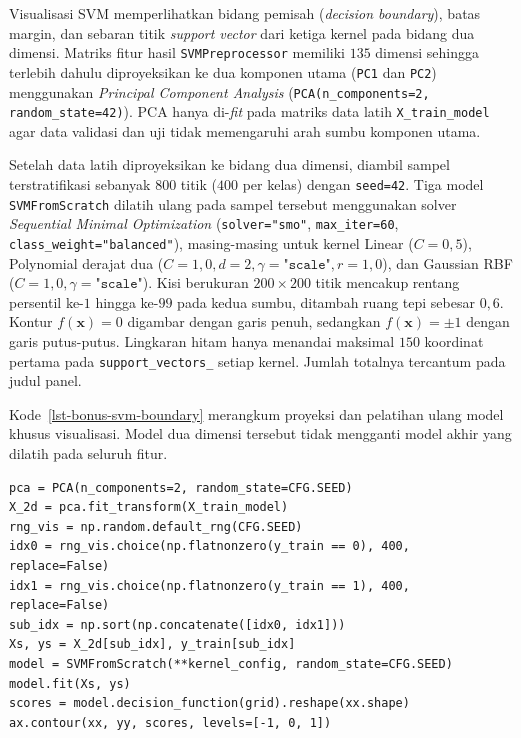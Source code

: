 Visualisasi SVM memperlihatkan bidang pemisah (\textit{decision boundary}), batas margin, dan sebaran titik \textit{support vector} dari ketiga kernel pada bidang dua dimensi. Matriks fitur hasil \texttt{SVMPreprocessor} memiliki $135$ dimensi sehingga terlebih dahulu diproyeksikan ke dua komponen utama (\texttt{PC1} dan \texttt{PC2}) menggunakan \textit{Principal Component Analysis} (\texttt{PCA(n\_components=2, random\_state=42)}). PCA hanya di-\textit{fit} pada matriks data latih \texttt{X\_train\_model} agar data validasi dan uji tidak memengaruhi arah sumbu komponen utama.

Setelah data latih diproyeksikan ke bidang dua dimensi, diambil sampel terstratifikasi sebanyak $800$ titik ($400$ per kelas) dengan \texttt{seed=42}. Tiga model \texttt{SVMFromScratch} dilatih ulang pada sampel tersebut menggunakan solver \textit{Sequential Minimal Optimization} (\texttt{solver="smo"}, \texttt{max\_iter=60}, \texttt{class\_weight="balanced"}), masing-masing untuk kernel Linear ($C=0{,}5$), Polynomial derajat dua ($C=1{,}0, d=2, \gamma=\texttt{"scale"}, r=1{,}0$), dan Gaussian RBF ($C=1{,}0, \gamma=\texttt{"scale"}$). Kisi berukuran $200 \times 200$ titik mencakup rentang persentil ke-$1$ hingga ke-$99$ pada kedua sumbu, ditambah ruang tepi sebesar $0{,}6$. Kontur $f(\mathbf{x}) = 0$ digambar dengan garis penuh, sedangkan $f(\mathbf{x}) = \pm 1$ dengan garis putus-putus. Lingkaran hitam hanya menandai maksimal $150$ koordinat pertama pada \texttt{support\_vectors\_} setiap kernel. Jumlah totalnya tercantum pada judul panel.

Kode~\ref{lst-bonus-svm-boundary} merangkum proyeksi dan pelatihan
ulang model khusus visualisasi. Model dua dimensi tersebut tidak mengganti
model akhir yang dilatih pada seluruh fitur.

\begin{lstlisting}[caption={Proyeksi PCA dan pelatihan SVM untuk visualisasi},label={lst-bonus-svm-boundary}]
pca = PCA(n_components=2, random_state=CFG.SEED)
X_2d = pca.fit_transform(X_train_model)
rng_vis = np.random.default_rng(CFG.SEED)
idx0 = rng_vis.choice(np.flatnonzero(y_train == 0), 400, replace=False)
idx1 = rng_vis.choice(np.flatnonzero(y_train == 1), 400, replace=False)
sub_idx = np.sort(np.concatenate([idx0, idx1]))
Xs, ys = X_2d[sub_idx], y_train[sub_idx]
model = SVMFromScratch(**kernel_config, random_state=CFG.SEED)
model.fit(Xs, ys)
scores = model.decision_function(grid).reshape(xx.shape)
ax.contour(xx, yy, scores, levels=[-1, 0, 1])
\end{lstlisting}

